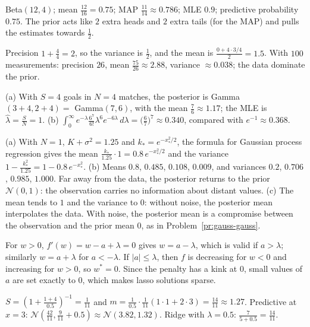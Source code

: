 \documentclass[11pt]{article}
\begin{document}
\begin{description}[leftmargin=0pt, itemsep=0.3em]
    \item[\ref{pr:beta-update}.] Beta$(12, 4)$; mean $\frac{12}{16} = 0.75$; MAP $\frac{11}{14} \approx 0.786$; MLE $0.9$; predictive probability $0.75$. The prior acts like $2$ extra heads and $2$ extra tails (for the MAP) and pulls the estimates towards $\frac{1}{2}$.
    \item[\ref{pr:gauss-gauss}.] Precision $1 + \frac{4}{4} = 2$, so the variance is $\frac{1}{2}$, and the mean is $\frac{0 + 4 \cdot 3/4}{2} = 1.5$. With $100$ measurements: precision $26$, mean $\frac{75}{26} \approx 2.88$, variance $\approx 0.038$; the data dominate the prior.
    \item[\ref{pr:gamma-poisson}.] (a) With $S = 4$ goals in $N = 4$ matches, the posterior is Gamma$(3 + 4, 2 + 4) = $ Gamma$(7, 6)$, with the mean $\frac{7}{6} \approx 1.17$; the MLE is $\hat\lambda = \frac{S}{N} = 1$. (b) $\int_0^\infty e^{-\lambda}\frac{6^7}{6!}\lambda^6e^{-6\lambda}\, d\lambda = \big(\frac{6}{7}\big)^7 \approx 0.340$, compared with $e^{-1} \approx 0.368$.
    \item[\ref{pr:gp-one-point}.] (a) With $N = 1$, $K + \sigma^2 = 1.25$ and $k_* = e^{-x_*^2/2}$, the formula for Gaussian process regression gives the mean $\frac{k_*}{1.25} \cdot 1 = 0.8\,e^{-x_*^2/2}$ and the variance $1 - \frac{k_*^2}{1.25} = 1 - 0.8\,e^{-x_*^2}$. (b) Means $0.8$, $0.485$, $0.108$, $0.009$, and variances $0.2$, $0.706$, $0.985$, $1.000$. Far away from the data, the posterior returns to the prior $\mathcal{N}(0, 1)$: the observation carries no information about distant values. (c) The mean tends to $1$ and the variance to $0$: without noise, the posterior mean interpolates the data. With noise, the posterior mean is a compromise between the observation and the prior mean $0$, as in Problem~\ref{pr:gauss-gauss}.
    \item[\ref{pr:soft-threshold}.] For $w > 0$, $f'(w) = w - a + \lambda = 0$ gives $w = a - \lambda$, which is valid if $a > \lambda$; similarly $w = a + \lambda$ for $a < -\lambda$. If $|a| \leq \lambda$, then $f$ is decreasing for $w < 0$ and increasing for $w > 0$, so $w^* = 0$. Since the penalty has a kink at $0$, small values of $a$ are set exactly to $0$, which makes lasso solutions sparse.
    \item[\ref{pr:blr-practice}.] $S = (1 + \frac{1 + 4}{0.5})^{-1} = \frac{1}{11}$ and $m = \frac{1}{0.5} \cdot \frac{1}{11}(1 \cdot 1 + 2 \cdot 3) = \frac{14}{11} \approx 1.27$. Predictive at $x = 3$: $\mathcal{N}(\frac{42}{11}, \frac{9}{11} + 0.5) \approx \mathcal{N}(3.82, 1.32)$. Ridge with $\lambda = 0.5$: $\frac{7}{5 + 0.5} = \frac{14}{11}$.

\end{description}
\end{document}
